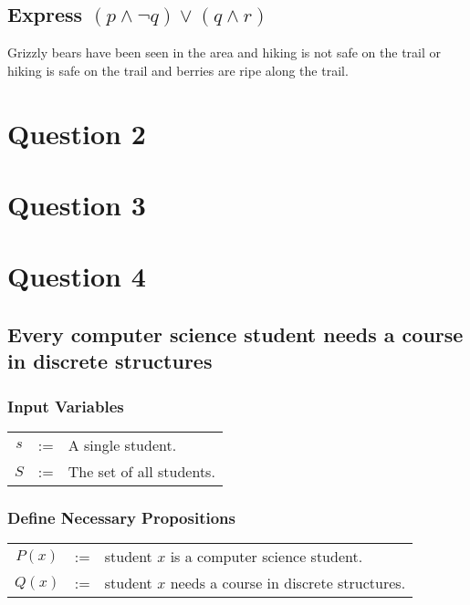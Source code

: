 \documentclass{article}
\begin{document}
\subsection{Express $(p \land \lnot q) \lor (q \land r)$}
Grizzly bears have been seen in the area and hiking is not safe on the trail or hiking is safe on the trail and berries are ripe along the trail.

\newpage

\section{Question 2}

\newpage

\section{Question 3}

\newpage

\section{Question 4}
%
\subsection{Every computer science student needs a course in discrete structures}
\subsubsection{Input Variables}
\begin{center}
  \begin{tabular}{ccl}
    $s$ & := & A single student. \\ 
    $S$ & := & The set of all students. \\ 
  \end{tabular}
\end{center}

\subsubsection{Define Necessary Propositions}
\begin{center}
  \begin{tabular}{ccl}
    $P(x)$ & := & student $x$ is a computer science student. \\
    $Q(x)$ & := & student $x$ needs a course in discrete structures. \\ 
  \end{tabular}
\end{center}
\end{document}
